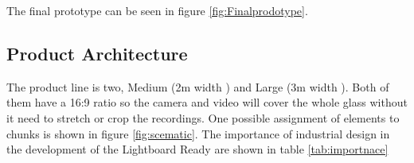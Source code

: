 \documentclass[a4paper]{jpconf}
\begin{document}
The final prototype can be seen in figure \ref{fig:Finalprodotype}.







\subsection{Product Architecture}
The product line is two, Medium (2m width ) and Large (3m width ). Both of them have a 16:9 ratio so the camera and video will cover the whole glass without it need to stretch or crop the recordings.
One possible assignment of elements to chunks is shown in figure \ref{fig:scematic}.
The importance of industrial design in the development of the Lightboard Ready are shown in table \ref{tab:importnace}
\end{document}
